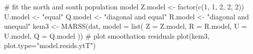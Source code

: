 \begin{Schunk}
\begin{Sinput}
 # fit the north and south population model
 Z.model <- factor(c(1, 1, 2, 2, 2))
 U.model <- "equal"
 Q.model <- "diagonal and equal"
 R.model <- "diagonal and unequal"
 kem3 <- MARSS(dat, model = list(
   Z = Z.model,
   R = R.model, U = U.model, Q = Q.model
 ))
 # plot smoothation residuals
 plot(kem3, plot.type="model.resids.ytT")
\end{Sinput}
\end{Schunk}
